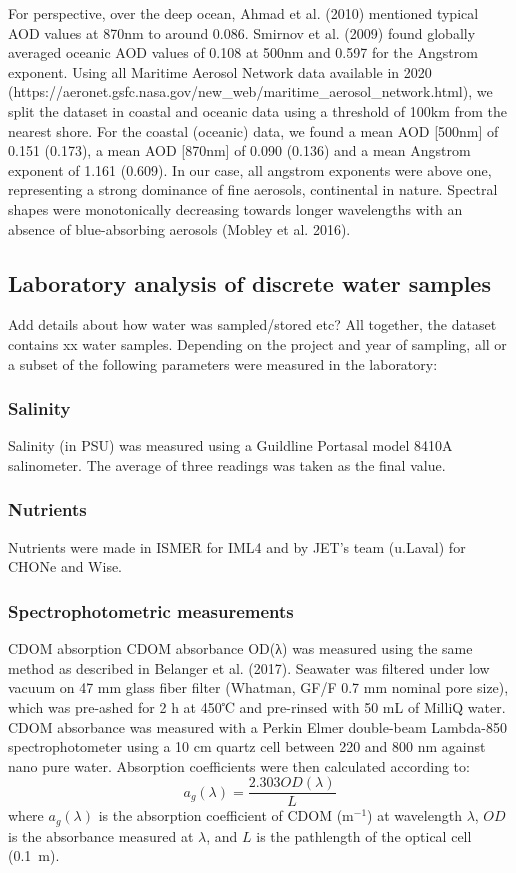 \documentclass[essd, manuscript]{copernicus}
\begin{document}
 
For perspective, over the deep ocean, Ahmad et al. (2010) mentioned typical AOD values at 870nm to around 0.086. Smirnov et al. (2009) found globally averaged oceanic AOD values of 0.108 at 500nm and 0.597 for the Angstrom exponent. Using all Maritime Aerosol Network data available in 2020 (https://aeronet.gsfc.nasa.gov/new\_web/maritime\_aerosol\_network.html), we split the dataset in coastal and oceanic data using a threshold of 100km from the nearest shore. For the coastal (oceanic) data, we found a mean AOD [500nm] of 0.151 (0.173), a mean AOD [870nm] of 0.090 (0.136) and a mean Angstrom exponent of 1.161 (0.609). In our case, all angstrom exponents were above one, representing a strong dominance of fine aerosols, continental in nature. Spectral shapes were monotonically decreasing towards longer wavelengths with an absence of blue-absorbing aerosols (Mobley et al. 2016).

\subsection{Laboratory analysis of discrete water samples} \label{labo}
Add details about how water was sampled/stored etc?
All together, the dataset contains xx water samples. Depending on the project and year of sampling, all or a subset of the following parameters were measured in the laboratory:

\subsubsection{Salinity}
Salinity (in PSU) was measured using a Guildline Portasal model 8410A salinometer. The average of three readings was taken as the final value.

\subsubsection{Nutrients}
Nutrients were made in ISMER for IML4 and by JET’s team (u.Laval) for CHONe and Wise.

\subsubsection{Spectrophotometric measurements}
CDOM absorption
CDOM absorbance OD(λ) was measured using the same method as described in Belanger et al. (2017). Seawater was filtered under low vacuum on 47 mm glass fiber filter (Whatman, GF/F 0.7 mm nominal pore size), which was pre-ashed for 2 h at 450℃ and pre-rinsed with 50 mL of MilliQ water. CDOM absorbance was measured with a Perkin Elmer double-beam Lambda-850 spectrophotometer using a 10 cm quartz cell between 220 and 800 nm against nano pure water. Absorption coefficients were then calculated according to:
\begin{equation}
a_g(\lambda) = \frac{2.303 OD(\lambda)}{L}
\label{eq:ag}
\end{equation}
where $a_g(\lambda)$ is the absorption coefficient of CDOM (m$^{-1}$) at wavelength $\lambda$, $OD$ is the absorbance measured at $\lambda$, and $L$ is the pathlength of the optical cell (0.1~m).
\end{document}
